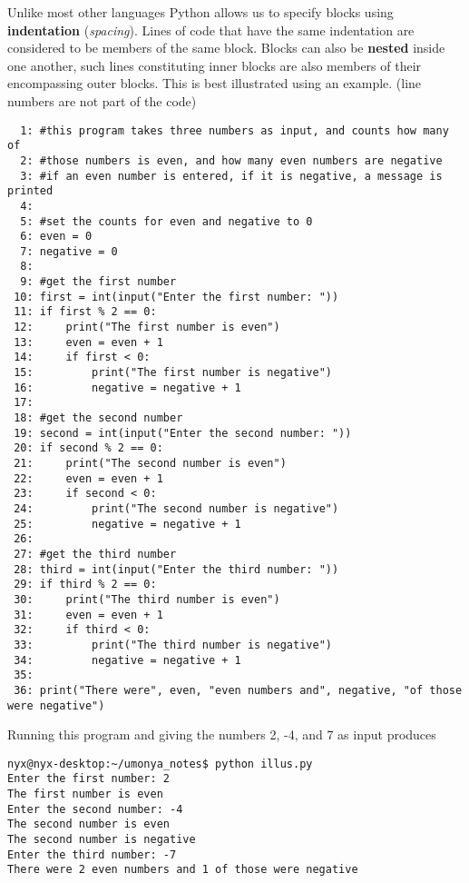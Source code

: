 Unlike most other languages Python allows us to specify blocks using   \textbf{indentation} (\textit{spacing}). Lines of code that have the same   indentation are considered to be members of the same block. Blocks can   also be \textbf{nested} inside one another, such lines   constituting inner blocks are also members of their encompassing outer   blocks. This is best illustrated using an example. (line numbers are   not part of the code)
\begin{lstlisting}
  1: #this program takes three numbers as input, and counts how many of
  2: #those numbers is even, and how many even numbers are negative
  3: #if an even number is entered, if it is negative, a message is printed
  4: 
  5: #set the counts for even and negative to 0
  6: even = 0
  7: negative = 0
  8: 
  9: #get the first number
 10: first = int(input("Enter the first number: "))
 11: if first % 2 == 0:
 12:     print("The first number is even")
 13:     even = even + 1
 14:     if first < 0:
 15:         print("The first number is negative")
 16:         negative = negative + 1
 17: 
 18: #get the second number
 19: second = int(input("Enter the second number: "))
 20: if second % 2 == 0:
 21:     print("The second number is even")
 22:     even = even + 1
 23:     if second < 0:
 24:         print("The second number is negative")
 25:         negative = negative + 1
 26: 
 27: #get the third number
 28: third = int(input("Enter the third number: "))
 29: if third % 2 == 0:
 30:     print("The third number is even")
 31:     even = even + 1
 32:     if third < 0:
 33:         print("The third number is negative")
 34:         negative = negative + 1
 35: 
 36: print("There were", even, "even numbers and", negative, "of those were negative")
\end{lstlisting}

Running this program and giving the numbers 2, -4, and 7 as input   produces
\begin{lstlisting}
nyx@nyx-desktop:~/umonya_notes$ python illus.py 
Enter the first number: 2
The first number is even
Enter the second number: -4
The second number is even
The second number is negative
Enter the third number: -7
There were 2 even numbers and 1 of those were negative
\end{lstlisting}

